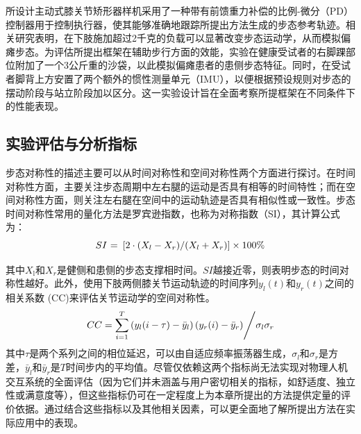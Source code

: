 所设计主动式膝关节矫形器样机采用了一种带有前馈重力补偿的比例-微分（PD）控制器用于控制执行器，使其能够准确地跟踪所提出方法生成的步态参考轨迹。相关研究\cite{zanottoAdaptiveAssistasneededController2014a}表明，在下肢施加超过2千克的负载可以显著改变步态运动学，从而模拟偏瘫步态。为评估所提出框架在辅助步行方面的效能，实验在健康受试者的右脚踝部位附加了一个3公斤重的沙袋，以此模拟偏瘫患者的患侧步态特征。同时，在受试者脚背上方安置了两个额外的惯性测量单元（IMU），以便根据预设规则对步态的摆动阶段与站立阶段加以区分。这一实验设计旨在全面考察所提框架在不同条件下的性能表现。


\subsection{实验评估与分析指标}步态对称性的描述主要可以从时间对称性和空间对称性两个方面进行探讨。在时间对称性方面，主要关注步态周期中左右腿的运动是否具有相等的时间特性；而在空间对称性方面，则关注左右腿在空间中的运动轨迹是否具有相似性或一致性。步态时间对称性常用的量化方法是罗宾逊指数\cite{viteckovaGaitSymmetryMeasures2018}，也称为对称指数（SI），其计算公式为：
\begin{equation}
\label{deqn_ex21}
{SI}{\text{ = }}\left[ {{{2 \cdot \left( {{X_l} - {X_r}} \right)} \mathord{\left/
{\vphantom {{2 \cdot \left( {{X_l} - {X_r}} \right)} {\left( {{X_l} + {X_r}} \right)}}} \right.
\kern-\nulldelimiterspace} {\left( {{X_l} + {X_r}} \right)}}} \right] \times 100 \%  
\end{equation}

其中${X_{\text{l}}}$和${X_r}$是健侧和患侧的步态支撑相时间。$SI$越接近零，则表明步态的时间对称性越好。此外，使用下肢两侧膝关节运动轨迹的时间序列${y_l(t)}$和${y_r(t)}$之间的相关系数 (CC)\cite{gouwandaIdentifyingGaitAsymmetry2011}来评估关节运动学的空间对称性。
\begin{equation}
\label{deqn_ex22}
CC = {{\sum\limits_{i = 1}^T {\left( {{y_l}(i - \tau) - {{\bar y}_l}} \right)} \left( {{y_r}(i ) - {{\bar y}_r}} \right)} \mathord{\left/
{\vphantom {{\sum\limits_{i = 1}^T {\left( {{y_l}(i) - {{\bar y}_l}} \right)}\left( {{y_r}(i + \tau ) - {{\bar y}_r}} \right)} {{\sigma _l}{\sigma _r}}}} \right.
\kern-\nulldelimiterspace} {{\sigma _l}{\sigma _r}}}
\end{equation}
其中$\tau$是两个系列之间的相位延迟，可以由自适应频率振荡器生成，${\sigma _l}$和${\sigma _r}$是方差，$\bar y_l$和$\bar y_r$是${T}$时间步内的平均值。尽管仅依赖这两个指标尚无法实现对物理人机交互系统的全面评估（因为它们并未涵盖与用户密切相关的指标，如舒适度、独立性或满意度等），但这些指标仍可在一定程度上为本章所提出的方法提供定量的评价依据。通过结合这些指标以及其他相关因素，可以更全面地了解所提出方法在实际应用中的表现。

